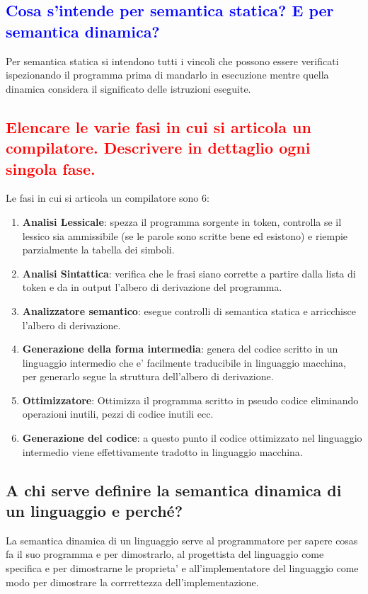 \documentclass{article}
\begin{document}
\subsection{\textcolor{blue}{Cosa s'intende per semantica statica? E per semantica dinamica?}}
Per semantica statica si intendono tutti i vincoli che possono essere verificati ispezionando il programma prima di mandarlo in esecuzione mentre quella dinamica considera il significato delle istruzioni eseguite.
\subsection{\textcolor{red}{Elencare le varie fasi in cui si articola un compilatore. Descrivere in dettaglio ogni singola fase.}}
Le fasi in cui si articola un compilatore sono 6:
\begin{enumerate}
    \item \textbf{Analisi Lessicale}: spezza il programma sorgente in token, controlla se il lessico sia ammissibile (se le parole sono scritte bene ed esistono) e riempie parzialmente la tabella dei simboli.
    \item \textbf{Analisi Sintattica}: verifica che le frasi siano corrette a partire dalla lista di token e da in output l'albero di derivazione del programma.
    \item \textbf{Analizzatore semantico}: esegue controlli di semantica statica e arricchisce l'albero di derivazione.
    \item \textbf{Generazione della forma intermedia}: genera del codice scritto in un linguaggio intermedio che e' facilmente traducibile in linguaggio macchina, per generarlo segue la struttura dell'albero di derivazione.
    \item \textbf{Ottimizzatore}: Ottimizza il programma scritto in pseudo codice eliminando operazioni inutili, pezzi di codice inutili ecc.
    \item \textbf{Generazione del codice}: a questo punto il codice ottimizzato nel linguaggio intermedio viene effettivamente tradotto in linguaggio macchina.
\end{enumerate}
\subsection{A chi serve definire la semantica dinamica di un linguaggio e perché?}
La semantica dinamica di un linguaggio serve al programmatore per sapere cosas
fa il suo programma e per dimostrarlo, al progettista del linguaggio come
specifica e per dimostrarne le proprieta' e all'implementatore del linguaggio
come modo per dimostrare la corrrettezza dell'implementazione.
\end{document}
